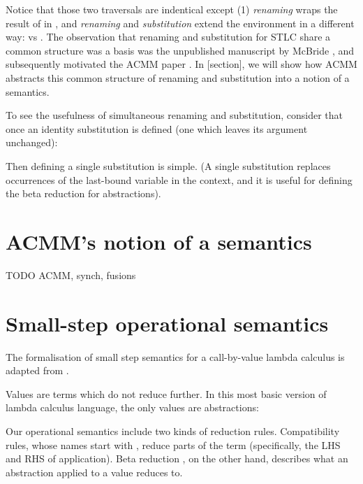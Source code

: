 \documentclass[bsc,frontabs,twoside,singlespacing,parskip,deptreport]{infthesis}
\theoremstyle{definition}
\begin{document}

Notice that those two traversals are indentical except (1)
\textit{renaming} wraps the result of  in , and
\textit{renaming} and \textit{substitution} extend the environment in
a different way:  vs . The observation that renaming and substitution for STLC share a
common structure was a basis was the unpublished manuscript by McBride
\cite{mcbride2005type}, and subsequently motivated the ACMM paper
\cite{DBLP:conf/cpp/Allais0MM17}. In [section], we will show how ACMM
abstracts this common structure of renaming and substitution into a
notion of a semantics.

To see the usefulness of simultaneous renaming and substitution,
consider that once an identity substitution is defined (one which
leaves its argument unchanged):


Then defining a single substitution is simple. (A single substitution
replaces occurrences of the last-bound variable in the context, and it
is useful for defining the beta reduction for abstractions).


\section{ACMM's notion of a semantics}

TODO ACMM, synch, fusions

\section{Small-step operational semantics}

The formalisation of small step semantics for a call-by-value lambda
calculus is adapted from \cite{DBLP:conf/sbmf/Wadler18}.

Values are terms which do not reduce further. In this most basic
version of lambda calculus language, the only values are abstractions:


Our operational semantics include two kinds of reduction rules. Compatibility rules, whose
names start with , reduce parts of the term (specifically, the LHS
and RHS of application). Beta reduction , on the other hand,
describes what an abstraction applied to a value reduces to.
\end{document}
